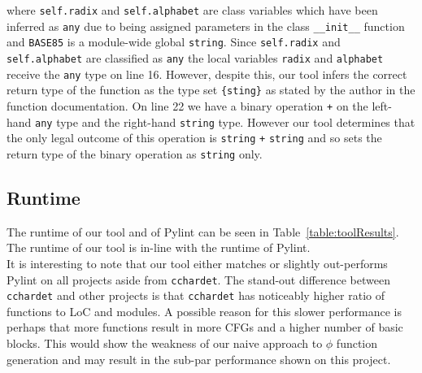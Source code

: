 \documentclass[12pt, titlepage]{article}
\begin{document}
where \texttt{self.radix} and \texttt{self.alphabet} are class variables which have been inferred as \texttt{any} due to being assigned parameters in the class \texttt{\_\_init\_\_} function and \texttt{BASE85} is a module-wide global \texttt{string}. Since \texttt{self.radix} and \texttt{self.alphabet} are classified as \texttt{any} the local variables \texttt{radix} and \texttt{alphabet} receive the \texttt{any} type on line 16. However, despite this, our tool infers the correct return type of the function as the type set \texttt{\{sting\}} as stated by the author in the function documentation. On line 22 we have a binary operation \texttt{+} on the left-hand \texttt{any} type and the right-hand \texttt{string} type. However our tool determines that the only legal outcome of this operation is \texttt{string} \texttt{+} \texttt{string} and so sets the return type of the binary operation as \texttt{string} only.

\subsection{Runtime}
The runtime of our tool and of Pylint can be seen in Table~\ref{table:toolResults}. The runtime of our tool is in-line with the runtime of Pylint. \\
\indent It is interesting to note that our tool either matches or slightly out-performs Pylint on all projects aside from \texttt{cchardet}. The stand-out difference between \texttt{cchardet} and other projects is that \texttt{cchardet} has noticeably higher ratio of functions to LoC and modules. A possible reason for this slower performance is perhaps that more functions result in more CFGs and a higher number of basic blocks. This would show the weakness of our naive approach to $\phi$ function generation and may result in the sub-par performance shown on this project.
\end{document}
